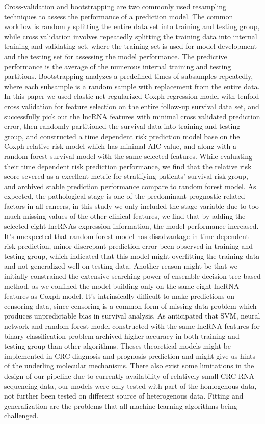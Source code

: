 \documentclass[fleqn,10pt]{wlscirep}
\begin{document}
Cross-validation and bootstrapping are two commonly used resampling techniques to assess the performance of a prediction model. The common workflow is randomly splitting the entire data set into training and testing group,  while cross validation involves repeatedly splitting the training data into internal training and validating set, where the training set is used for model development and the testing set for assessing the model performance. The predictive performance is the average of the numerous internal training and testing partitions. Bootstrapping analyzes a predefined times of subsamples repeatedly, where each subsample is a random sample with replacement from the entire data. In this paper we used elastic net regularized Coxph regression model with tenfold cross validation for feature selection on the entire follow-up survival data set, and successfully pick out the lncRNA features with minimal cross validated prediction error, then randomly partitioned the survival data into training and testing group, and constructed a time dependent risk prediction model base on the Coxph relative risk model which has minimal AIC value, and along with a random forest survival model with the same selected features. While evaluating their time dependent risk prediction performance, we find that the relative risk score severed as a excellent metric for stratifying patients' survival risk group, and archived stable prediction performance compare to random forest model. As expected, the pathological stage is one of the predominant prognostic related factors in all cancers, in this study we only included the stage variable due to too much missing values of the other clinical features, we find that by adding the selected eight lncRNAs expression information, the model performance increased. It's unexpected that random forest model has disadvantage in time dependent risk prediction, minor discrepant prediction error been observed in training and testing group, which indicated that this model might overfitting the training data and not generalized well on testing data. Another reason might be that we initially constrained the extensive searching  power of ensemble decision-tree based method, as we confined the model building only on the same eight lncRNA features as Coxph model. It's intrinsically difficult to make predictions on censoring data, since censoring is a common form of missing data problem which produces unpredictable bias in survival analysis. As anticipated that SVM, neural network and random forest model constructed with the same lncRNA features for binary classification problem archived higher accuracy in both training and testing group than other algorithms. Theses theoretical models might be implemented in CRC diagnosis and prognosis prediction and might give us hints of the underling molecular mechanisms. There also exist some limitations in the design of our pipeline due to currently availability of relatively small CRC RNA sequencing data, our models were only tested with part of the homogenous data, not further been tested on different source of heterogenous data. Fitting and generalization are the problems that all machine learning algorithms being challenged.
\end{document}
